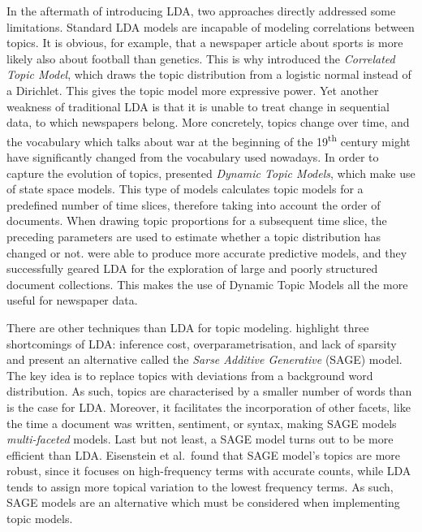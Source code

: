 In the aftermath of introducing LDA, two approaches directly addressed some limitations. Standard LDA models are incapable of modeling correlations between topics. It is obvious, for example, that a newspaper article about sports is more likely also about football than genetics. This is why \citet{Blei:2005:CTM:2976248.2976267} introduced the \textit{Correlated Topic Model}, which draws the topic distribution from a logistic normal instead of a Dirichlet. This gives the topic model more expressive power. Yet another weakness of traditional LDA is that it is unable to treat change in sequential data, to which newspapers belong. More concretely, topics change over time, and the vocabulary which talks about war at the beginning of the 19\textsuperscript{th} century might have significantly changed from the vocabulary used nowadays. In order to capture the evolution of topics, \citet{bleidynamic2006} presented \textit{Dynamic Topic Models}, which make use of state space models. This type of models calculates topic models for a predefined number of time slices, therefore taking into account the order of documents. When drawing topic proportions for a subsequent time slice, the preceding parameters are used to estimate whether a topic distribution has changed or not. \citet{bleidynamic2006} were able to produce more accurate predictive models, and they successfully geared LDA for the exploration of large and poorly structured document collections. This makes the use of Dynamic Topic Models all the more useful for newspaper data. 

There are other techniques than LDA for topic modeling. \citet{EisensteinAX11} highlight three shortcomings of LDA: inference cost, overparametrisation, and lack of sparsity and present an alternative called the \textit{Sarse Additive Generative} (SAGE) model. The key idea is to replace topics with deviations from a background word distribution. As such, topics are characterised by a smaller number of words than is the case for LDA. Moreover, it facilitates the incorporation of other facets, like the time a document was written, sentiment, or syntax, making SAGE models \textit{multi-faceted} models. Last but not least, a SAGE model turns out to be more efficient than LDA. Eisenstein et al.~found that SAGE model's topics are more robust, since it focuses on high-frequency terms with accurate counts, while LDA tends to assign more topical variation to the lowest frequency terms. As such, SAGE models are an alternative which must be considered when implementing topic models.

